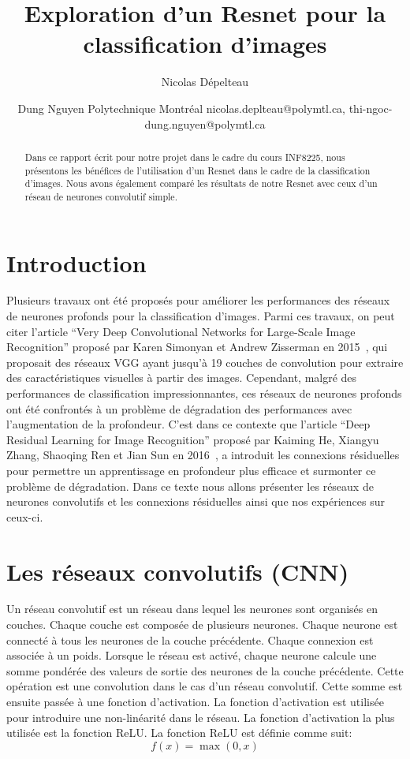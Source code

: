 \documentclass{article}
\title{Exploration d'un Resnet pour la classification d'images}
\author{
Nicolas Dépelteau
\and
Dung Nguyen
\affiliations{}
Polytechnique Montréal
\emails{}
nicolas.deplteau@polymtl.ca,
thi-ngoc-dung.nguyen@polymtl.ca
}
\begin{document}
\maketitle

\begin{abstract}
    Dans ce rapport écrit pour notre projet dans le cadre du cours INF8225,
    nous présentons les bénéfices de l'utilisation
    d'un Resnet dans le cadre de la classification d'images. Nous avons également comparé les
    résultats de notre Resnet avec ceux d'un réseau de neurones convolutif simple. 
\end{abstract}

\section{Introduction}

Plusieurs travaux ont été proposés pour améliorer les performances des réseaux de neurones profonds pour la classification d'images.
Parmi ces travaux, on peut citer l'article ``Very Deep Convolutional Networks for Large-Scale Image Recognition'' proposé par Karen
Simonyan et Andrew Zisserman en 2015~\cite{simonyan2015deep}, qui proposait des réseaux VGG ayant jusqu'à 19 couches de convolution pour extraire des
caractéristiques visuelles à partir des images.
Cependant, malgré des performances de classification impressionnantes, ces réseaux de neurones profonds ont été confrontés à un
problème de dégradation des performances avec l'augmentation de la profondeur.
C'est dans ce contexte que l'article ``Deep Residual Learning for Image Recognition'' proposé par Kaiming He, Xiangyu Zhang,
Shaoqing Ren et Jian Sun en 2016~\cite{resnet}, a introduit les connexions résiduelles pour permettre un apprentissage en profondeur plus efficace
et surmonter ce problème de dégradation.
Dans ce texte nous allons présenter les réseaux de neurones convolutifs et les connexions résiduelles ainsi que nos expériences
sur ceux-ci.

\section{Les réseaux convolutifs (CNN)}
Un réseau convolutif est un réseau dans lequel les neurones sont organisés en couches.
Chaque couche est composée de plusieurs neurones. Chaque neurone est connecté à tous les neurones de la couche précédente.
Chaque connexion est associée à un poids. Lorsque le réseau est activé, chaque neurone calcule une somme
pondérée des valeurs de sortie des neurones de la couche précédente.
Cette opération est une convolution dans le cas d'un réseau convolutif.
Cette somme est ensuite passée à une fonction d'activation.
La fonction d'activation est utilisée pour introduire une non-linéarité dans le réseau.
La fonction d'activation la plus utilisée est la fonction ReLU.\@
La fonction ReLU est définie comme suit:
\begin{equation}
    f(x) = \max(0, x)
\end{equation}
\end{document}
